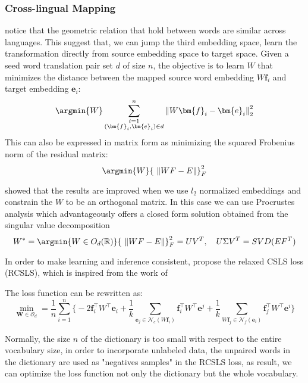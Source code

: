\subsubsection{Cross-lingual Mapping}
\cite{mikolov2013exploiting} notice that the geometric relation that hold between words are similar across languages. This suggest that, we can jump the third embedding space, learn the transformation directly from source embedding space to target space.
Given a seed word translation pair set $d$ of size $n$, the objective is to learn $W$ that minimizes the distance between the mapped source word embedding $W\bm{f}_i$ and target embedding $\bm{e}_i$:
\[ \argmin{W} \sum_{\substack{i=1\\ (\bm{f}_i, \bm{e}_i) \in d} }^n {\lVert W\bm{f}_i - \bm{e}_i \rVert}_2^2 \]
This can also be expressed in matrix form as minimizing the squared Frobenius norm of the residual matrix:
\[ \argmin{W} {\ \lVert WF - E \rVert}_F^2 \]



 \cite{xing2015normalized} showed that the results are improved when we use $l_2$ normalized embeddings and constrain the ${W}$ to be an orthogonal matrix. In this case we can use Procrustes analysis which advantageously offers a closed form solution obtained from the singular value decomposition 
\[W^* = \argmin{W \in O_d(\mathbb{R})} {\ \lVert WF - E \rVert}_F^2 = UV^T , \quad U\Sigma V^T = SVD(EF^T) \]

In order to make learning and inference consistent, \cite{DBLP:journals/corr/abs-1804-07745} propose the relaxed CSLS loss (RCSLS), which is inspired from the work of \cite{conneau2017word}

The loss function can be rewritten as:
\[ \min_{\bm{W} \in \mathcal{O}_d} = \frac{1}{n} \sum_{i=1}^{n} \Big\{ -2 \bm{f}_i^\top W^\top \bm{e}_i + \frac{1}{k} \sum_{\bm{e}_j \in \mathcal{N}_e(W\bm{f}_i)} \bm{f}_i^\top W^\top \bm{e}^j + \frac{1}{k} \sum_{W\bm{f}_j \in \mathcal{N}_f(\bm{e}_i)} \bm{f}_j^\top W^\top \bm{e}^i  \Big\}\]


Normally, the size $n$ of the dictionary is too small with respect to the entire vocabulary size, in order to incorporate unlabeled data, the unpaired words in the dictionary are used as "negatives samples" in the RCSLS loss, as result, we can optimize the loss function not only the dictionary but the whole vocabulary.

	
	